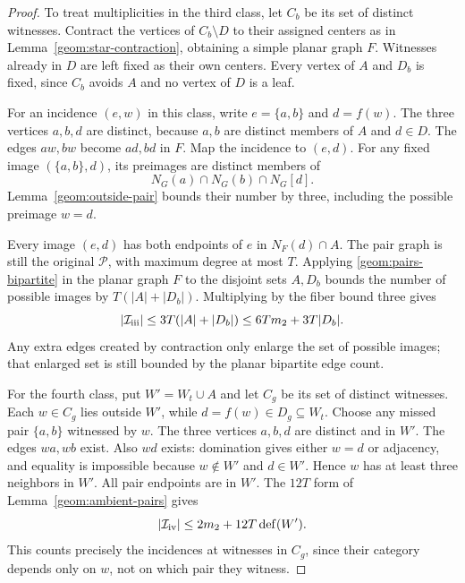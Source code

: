 \documentclass[11pt,a4paper]{article}
\theoremstyle{definition}
\theoremstyle{remark}
\DeclareMathOperator{\Def}{def}
\begin{document}
\begin{proof}
To treat multiplicities in the third class, let $C_b$ be its set of
distinct witnesses. Contract the vertices of $C_b\setminus D$ to their
assigned centers as in Lemma~\ref{geom:star-contraction}, obtaining a
simple planar graph $F$. Witnesses already in $D$ are left fixed as
their own centers. Every vertex of $A$ and $D_b$ is fixed, since $C_b$
avoids $A$ and no vertex of $D$ is a leaf.

For an incidence $(e,w)$ in this class, write $e=\{a,b\}$ and
$d=f(w)$. The three vertices $a,b,d$ are distinct, because $a,b$ are
distinct members of $A$ and $d\in D$. The edges $aw,bw$ become $ad,bd$
in $F$. Map the incidence to $(e,d)$. For any fixed image
$(\{a,b\},d)$, its preimages are distinct members of
\[
 N_G(a)\cap N_G(b)\cap N_G[d].
\]
Lemma~\ref{geom:outside-pair} bounds their number by three, including
the possible preimage $w=d$.

Every image $(e,d)$ has both endpoints of $e$ in $N_F(d)\cap A$.
The pair graph is still the original $\mathcal P$, with maximum
degree at most $T$. Applying \eqref{geom:pairs-bipartite} in the planar
graph $F$ to the disjoint sets $A,D_b$ bounds the number of possible
images by $T(|A|+|D_b|)$. Multiplying by the fiber bound three gives
\begin{equation}\label{geom:pair-cat-three}
 |\mathcal I_{\rm iii}|
 \leq3T(|A|+|D_b|)\leq6Tm_2+3T|D_b|.
\end{equation}
Any extra edges created by contraction only enlarge the set of possible
images; that enlarged set is still bounded by the planar bipartite
edge count.

For the fourth class, put $W'=W_t\cup A$ and let $C_g$ be its set of
distinct witnesses. Each $w\in C_g$ lies outside $W'$, while
$d=f(w)\in D_g\subseteq W_t$. Choose any missed pair $\{a,b\}$
witnessed by $w$. The three vertices $a,b,d$ are distinct and in $W'$.
The edges $wa,wb$ exist. Also $wd$ exists: domination gives either
$w=d$ or adjacency, and equality is impossible because $w\notin W'$
and $d\in W'$. Hence $w$ has at least three neighbors in $W'$.
All pair endpoints are in $W'$. The $12T$ form of
Lemma~\ref{geom:ambient-pairs} gives
\begin{equation}\label{geom:pair-cat-four-pre}
 |\mathcal I_{\rm iv}|\leq2m_2+12T\Def(W').
\end{equation}
This counts precisely the incidences at witnesses in $C_g$, since
their category depends only on $w$, not on which pair they witness.


\end{proof}
\end{document}
